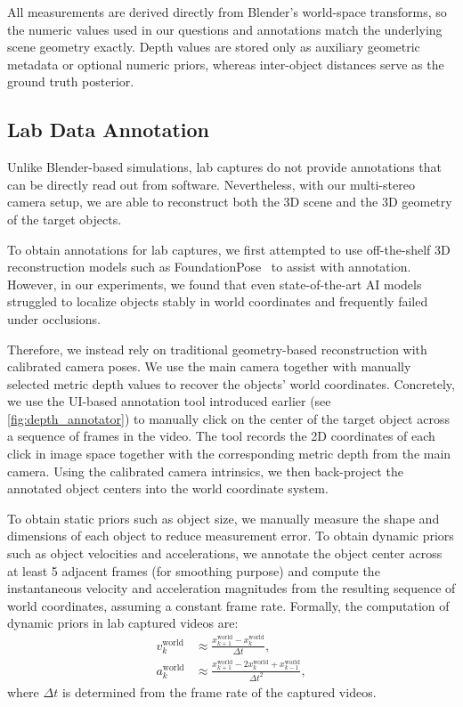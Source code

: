 All measurements are derived directly from Blender's world-space transforms, so the numeric values used in our questions and annotations match the underlying scene geometry exactly. Depth values are stored only as auxiliary geometric
metadata or optional numeric priors, whereas inter-object distances serve as the ground truth posterior.


\subsection{Lab Data Annotation}

Unlike Blender-based simulations, lab captures do not provide annotations that can be directly read out from software. Nevertheless, with our multi-stereo camera setup, we are able to reconstruct both the 3D scene and the 3D geometry of the target objects.

To obtain annotations for lab captures, we first attempted to use off-the-shelf 3D reconstruction models such as FoundationPose~\cite{wen2024foundationpose} to assist with annotation. However, in our experiments, we found that even state-of-the-art AI models struggled to localize objects stably in world coordinates and frequently failed under occlusions. 

Therefore, we instead rely on traditional geometry-based reconstruction with calibrated camera poses. We use the main camera together with manually selected metric depth values to recover the objects' world coordinates. Concretely, we use the UI-based annotation tool introduced earlier (see \autoref{fig:depth_annotator}) to manually click on the center of the target object across a sequence of frames in the video. The tool records the 2D coordinates of each click in image space together with the corresponding metric depth from the main camera. Using the calibrated camera intrinsics, we then back-project the annotated object centers into the world coordinate system.

To obtain static priors such as object size, we manually measure the shape and dimensions of each object to reduce measurement error. To obtain dynamic priors such as object velocities and accelerations, we annotate the object center across at least 5 adjacent frames (for smoothing purpose) and compute the instantaneous velocity and acceleration magnitudes from the resulting sequence of world coordinates, assuming a constant frame rate. Formally, the computation of dynamic priors in lab captured videos are:
\begin{align*}
v_k^{\mathrm{world}} 
  &\approx \frac{x_{k+1}^{\mathrm{world}} - x_{k}^{\mathrm{world}}}{\Delta t}, \\
a_k^{\mathrm{world}} 
  &\approx \frac{x_{k+1}^{\mathrm{world}} - 2 x_{k}^{\mathrm{world}} + x_{k-1}^{\mathrm{world}}}{\Delta t^2}, 
\end{align*}
where $\Delta t$ is determined from the frame rate of the captured videos.

